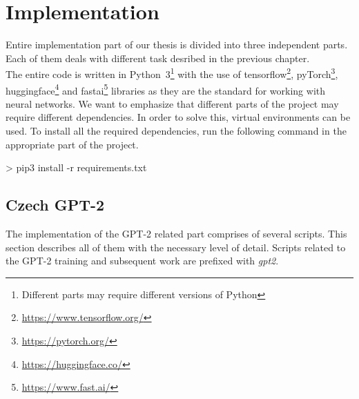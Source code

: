 \chapter{Implementation}
Entire implementation part of our thesis is divided into three independent parts. Each of them deals with different task desribed in the previous chapter.\\

The entire code is written in Python~3\footnote[1]{Different parts may require different versions of Python} with the use of tensorflow\footnote[2]{\url{https://www.tensorflow.org/}}, pyTorch\footnote[3]{\url{https://pytorch.org/}}, huggingface\footnote[4]{\url{https://huggingface.co/}} and fastai\footnote[5]{\url{https://www.fast.ai/}} libraries as they are the standard for working with neural networks. We want to emphasize that different parts of the project may require different dependencies. In order to solve this, virtual environments can be used. To install all the required dependencies, run the following command in the appropriate part of the project.

\begin{code}
> pip3 install -r requirements.txt
\end{code}

\section{Czech GPT-2}
The implementation of the GPT-2 related part comprises of several scripts. This section describes all of them with the necessary level of detail. Scripts related to the GPT-2 training and subsequent work are prefixed with \textit{gpt2}.

